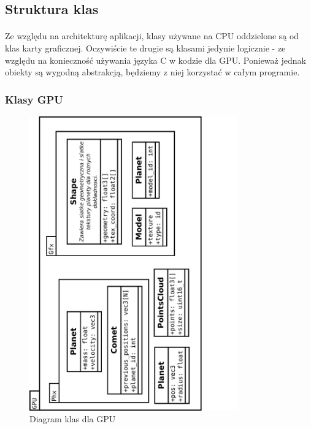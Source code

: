 \subsection{Struktura klas}\label{sub:struktura klas}
\paragraph{}
Ze względu na architekturę aplikacji, klasy używane na CPU oddzielone są od klas karty graficznej. Oczywiście te drugie są klasami jedynie logicznie - ze względu na konieczność używania języka C w kodzie dla GPU. Ponieważ jednak obiekty są wygodną abstrakcją, będziemy z niej korzystać w całym programie.

\subsubsection{Klasy GPU}

\begin{figure}[h]
	\centering
	\includegraphics[angle=270,width=0.8\textwidth]{class_gpu.pdf}
	\caption{Diagram klas dla GPU}
	\label{fig:class_gpu}
\end{figure}


